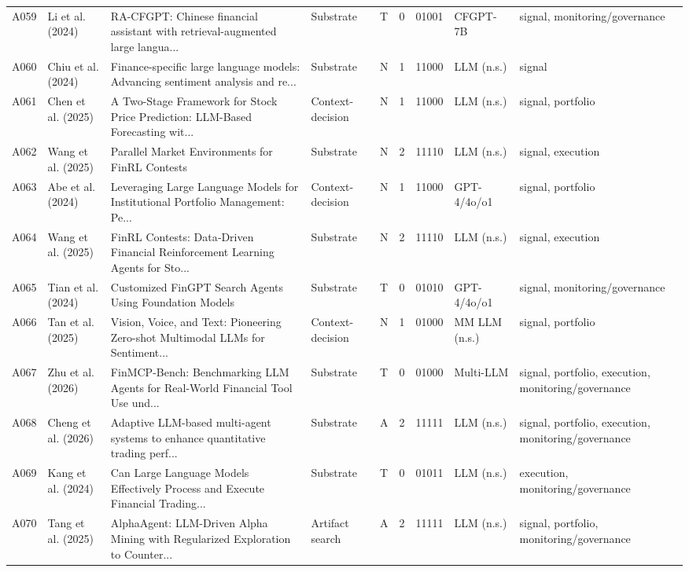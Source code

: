 \begin{longtable}{p{0.7cm} p{1.9cm} p{3.85cm} p{1.7cm} p{0.65cm} p{0.55cm} p{1.2cm} p{1.8cm} p{2.0cm}}
A059 & Li et al. (2024) & RA-CFGPT: Chinese financial assistant with retrieval-augmented large langua... & Substrate & T & 0 & 01001 & CFGPT-7B & signal, monitoring/governance \\
A060 & Chiu et al. (2024) & Finance-specific large language models: Advancing sentiment analysis and re... & Substrate & N & 1 & 11000 & LLM (n.s.) & signal \\
A061 & Chen et al. (2025) & A Two-Stage Framework for Stock Price Prediction: LLM-Based Forecasting wit... & Context-decision & N & 1 & 11000 & LLM (n.s.) & signal, portfolio \\
A062 & Wang et al. (2025) & Parallel Market Environments for FinRL Contests & Substrate & N & 2 & 11110 & LLM (n.s.) & signal, execution \\
A063 & Abe et al. (2024) & Leveraging Large Language Models for Institutional Portfolio Management: Pe... & Context-decision & N & 1 & 11000 & GPT-4/4o/o1 & signal, portfolio \\
A064 & Wang et al. (2025) & FinRL Contests: Data‐Driven Financial Reinforcement Learning Agents for Sto... & Substrate & N & 2 & 11110 & LLM (n.s.) & signal, execution \\
A065 & Tian et al. (2024) & Customized FinGPT Search Agents Using Foundation Models & Substrate & T & 0 & 01010 & GPT-4/4o/o1 & signal, monitoring/governance \\
A066 & Tan et al. (2025) & Vision, Voice, and Text: Pioneering Zero-shot Multimodal LLMs for Sentiment... & Context-decision & N & 1 & 01000 & MM LLM (n.s.) & signal, portfolio \\
A067 & Zhu et al. (2026) & FinMCP-Bench: Benchmarking LLM Agents for Real-World Financial Tool Use und... & Substrate & T & 0 & 01000 & Multi-LLM & signal, portfolio, execution, monitoring/governance \\
A068 & Cheng et al. (2026) & Adaptive LLM-based multi-agent systems to enhance quantitative trading perf... & Substrate & A & 2 & 11111 & LLM (n.s.) & signal, portfolio, execution, monitoring/governance \\
A069 & Kang et al. (2024) & Can Large Language Models Effectively Process and Execute Financial Trading... & Substrate & T & 0 & 01011 & LLM (n.s.) & execution, monitoring/governance \\
A070 & Tang et al. (2025) & AlphaAgent: LLM-Driven Alpha Mining with Regularized Exploration to Counter... & Artifact search & A & 2 & 11111 & LLM (n.s.) & signal, portfolio, monitoring/governance \\

\end{longtable}
